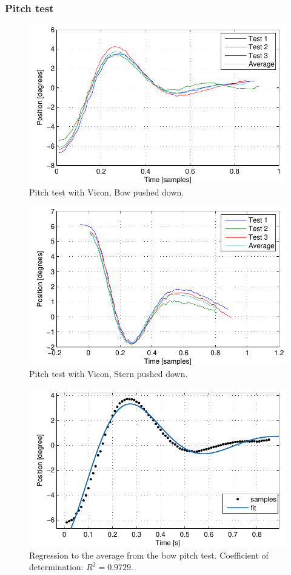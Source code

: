 \subsubsection{Pitch test}
\begin{figure}[H]
	\centering
	\includegraphics{plot/pbtest}
	\caption{Pitch test with Vicon, Bow pushed down.}
	\label{fig:pbtest}
\end{figure}
\begin{figure}[H]
	\centering
	\includegraphics{plot/pstest}
	\caption{Pitch test with Vicon, Stern pushed down.}
	\label{fig:pstest}
\end{figure}
\begin{figure}[H]
	\centering
	\includegraphics{plot/gns_pb}
	\caption{Regression to the average from the bow pitch test. Coefficient of determination: $R^2 = 0.9729$.}
	\label{fig:gnspb}
\end{figure}
